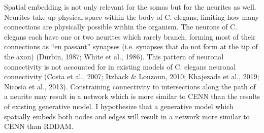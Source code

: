 Spatial embedding is not only relevant for the somas but for the neurites as well. Neurites take up physical space within the body of C. elegans, limiting how many connections are physically possible within the organism. The neurons of C. elegans each have one or two neurites which rarely branch, forming most of their connections as “en passant” synapses (i.e. synapses that do not form at the tip of the axon) (Durbin, 1987; White et al., 1986). This pattern of neuronal connectivity is not accounted for in existing models of C. elegans neuronal connectivity (Costa et al., 2007; Itzhack \& Louzoun, 2010; Khajezade et al., 2019; Nicosia et al., 2013). Constraining connectivity to intersections along the path of a neurite may result in a network which is more similar to CENN than the results of existing generative model. I hypothesize that a generative model which spatially embeds both nodes and edges will result in a network more similar to CENN than RDDAM.
